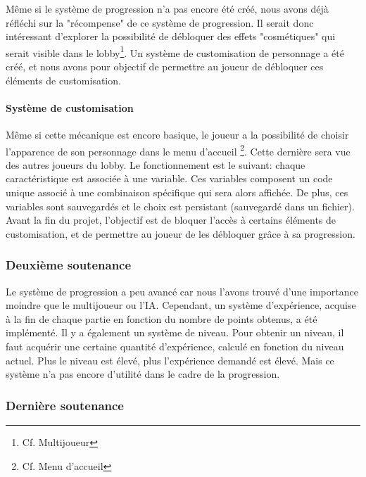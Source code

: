         Même si le système de progression n'a pas encore été créé, nous avons déjà réfléchi sur la "récompense" de ce système de progression. Il serait donc 
        intéressant d'explorer la possibilité de débloquer des effets "cosmétiques" qui serait visible dans le lobby\footnote{Cf. Multijoueur}. Un système de 
        customisation de personnage a été créé, et nous avons pour objectif de permettre au joueur de débloquer ces éléments de customisation.


        \paragraph{Système de customisation}

        Même si cette mécanique est encore basique, le joueur a la possibilité de choisir l'apparence de son personnage dans le menu d'accueil
        \footnote{Cf. Menu d'accueil}. Cette dernière sera vue des autres joueurs du lobby. Le fonctionnement est le suivant: chaque caractéristique est associée 
        à une variable. Ces variables composent un code unique associé à une combinaison spécifique qui sera alors affichée. De plus, ces variables sont 
        sauvegardés et le choix est persistant (sauvegardé dans un fichier). Avant la fin du projet, l'objectif est de bloquer l'accès à certains éléments de 
        customisation, et de permettre au joueur de les débloquer grâce à sa progression.

    \vspace{0.5cm}
    \subsubsection{Deuxième soutenance}
    \vspace{0.5cm}

        Le système de progression a peu avancé car nous l'avons trouvé d'une importance moindre que le multijoueur ou l'IA.
        Cependant, un système d'expérience, acquise à la fin de chaque partie en fonction du nombre de
        points obtenus, a été implémenté. Il y a également un système de niveau. Pour obtenir un niveau, il faut
        acquérir une certaine quantité d'expérience, calculé en fonction du niveau actuel. Plus le niveau est élevé,
        plus l'expérience demandé est élevé. Mais ce système n'a pas encore d'utilité dans le cadre de la progression.

    \vspace{0.5cm}
    \subsubsection{Dernière soutenance}
    \vspace{0.5cm}

